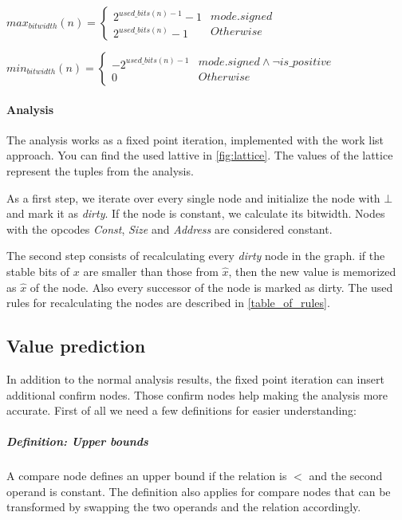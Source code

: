 $
max_{bitwidth}(n)=
\left\{
\begin{array}{l}2^{used\_bits(n)-1}-1\\2^{used\_bits(n)}-1\end{array}
\begin{array}{l} {mode.signed} \\ {Otherwise} \end{array}
\right.
$

$
min_{bitwidth}(n)=
\left\{
\begin{array}{l}-2^{used\_bits(n)-1}\\0\end{array}
\begin{array}{l} {mode.signed \wedge \neg is\_positive} \\ {Otherwise} \end{array}
\right.
$



\paragraph{Analysis}
\label{analysis_explain}
The analysis works as a fixed point iteration, implemented with the work list approach. You can find the used lattive in \autoref{fig:lattice}. The values of the lattice represent the tuples from the analysis.

As a first step, we iterate over every single node and initialize the node with $\bot$ and mark it as \textit{dirty}. If the node is constant, we calculate its bitwidth. Nodes with the opcodes \textit{Const}, \textit{Size} and \textit{Address} are considered constant.

The second step consists of recalculating every \textit{dirty} node in the graph. 
if the stable bits of $x$ are smaller than those from $\hat{x}$, 
then the new value is memorized as $\hat{x}$ of the node. Also every successor of the node is marked as dirty. The used rules for recalculating the nodes are described in \autoref{table_of_rules}.

\subsection{Value prediction}
In addition to the normal analysis results, the fixed point iteration can insert additional confirm nodes. Those confirm nodes help making the analysis more accurate.
First of all we need a few definitions for easier understanding:

\subparagraph{Definition: Upper bounds}
A compare node defines an upper bound if the relation is $<$ and the second operand is constant.\newline
The definition also applies for compare nodes that can be transformed by swapping the two operands and the relation accordingly.

